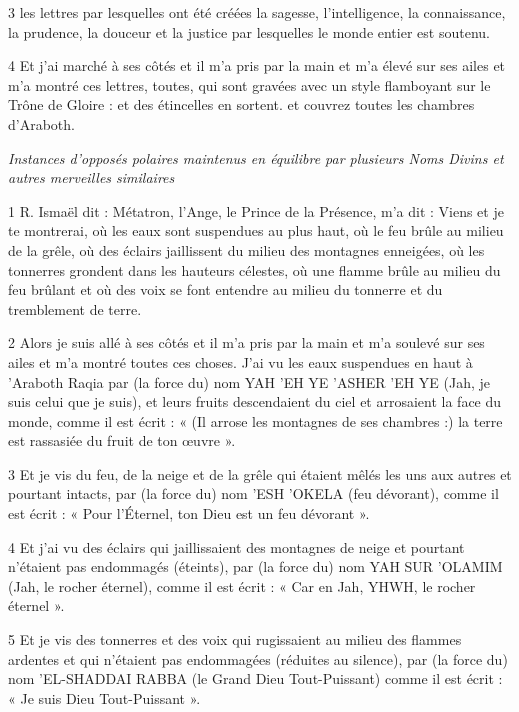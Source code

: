 \par 3 les lettres par lesquelles ont été créées la sagesse, l'intelligence, la connaissance, la prudence, la douceur et la justice par lesquelles le monde entier est soutenu.

\par 4 Et j'ai marché à ses côtés et il m'a pris par la main et m'a élevé sur ses ailes et m'a montré ces lettres, toutes, qui sont gravées avec un style flamboyant sur le Trône de Gloire : et des étincelles en sortent. et couvrez toutes les chambres d'Araboth.



\par \textit{Instances d'opposés polaires maintenus en équilibre par plusieurs Noms Divins et autres merveilles similaires}

\par 1 R. Ismaël dit : Métatron, l'Ange, le Prince de la Présence, m'a dit : Viens et je te montrerai, où les eaux sont suspendues au plus haut, où le feu brûle au milieu de la grêle, où des éclairs jaillissent du milieu des montagnes enneigées, où les tonnerres grondent dans les hauteurs célestes, où une flamme brûle au milieu du feu brûlant et où des voix se font entendre au milieu du tonnerre et du tremblement de terre.

\par 2 Alors je suis allé à ses côtés et il m'a pris par la main et m'a soulevé sur ses ailes et m'a montré toutes ces choses. J'ai vu les eaux suspendues en haut à 'Araboth Raqia par (la force du) nom YAH 'EH YE 'ASHER 'EH YE (Jah, je suis celui que je suis), et leurs fruits descendaient du ciel et arrosaient la face du monde, comme il est écrit : « (Il arrose les montagnes de ses chambres :) la terre est rassasiée du fruit de ton œuvre ».

\par 3 Et je vis du feu, de la neige et de la grêle qui étaient mêlés les uns aux autres et pourtant intacts, par (la force du) nom 'ESH 'OKELA (feu dévorant), comme il est écrit : « Pour l'Éternel, ton Dieu est un feu dévorant ».

\par 4 Et j'ai vu des éclairs qui jaillissaient des montagnes de neige et pourtant n'étaient pas endommagés (éteints), par (la force du) nom YAH SUR 'OLAMIM (Jah, le rocher éternel), comme il est écrit : « Car en Jah, YHWH, le rocher éternel ».

\par 5 Et je vis des tonnerres et des voix qui rugissaient au milieu des flammes ardentes et qui n'étaient pas endommagées (réduites au silence), par (la force du) nom 'EL-SHADDAI RABBA (le Grand Dieu Tout-Puissant) comme il est écrit : « Je suis Dieu Tout-Puissant ».

